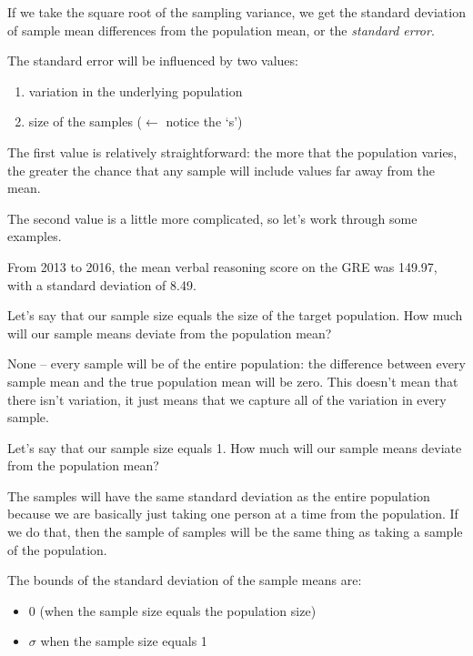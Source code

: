 \documentclass[11pt]{lecturenotes}
\begin{document}

If we take the square root of the sampling variance, we get the standard deviation of sample mean differences from the population mean, or the \emph{standard error}.


\slide
The standard error will be influenced by two values:
\begin{enumerate}
\item variation in the underlying population
\item size of the samples ($\leftarrow$ notice the `s')
\end{enumerate}

The first value is relatively straightforward: the more that the population varies, the greater the chance that any sample will include values far away from the mean. 

The second value is a little more complicated, so let's work through some examples. 

From 2013 to 2016, the mean verbal reasoning score on the GRE was 149.97, with a standard deviation of 8.49.

Let's say that our sample size equals the size of the target population. How much will our sample means deviate from the population mean? 

None -- every sample will be of the entire population: the difference between every sample mean and the true population mean will be zero. This doesn't mean that there isn't variation, it just means that we capture all of the variation in every sample. 

Let's say that our sample size equals 1. How much will our sample means deviate from the population mean? 

The samples will have the same standard deviation as the entire population because we are basically just taking one person at a time from the population. If we do that, then the sample of samples will be the same thing as taking a sample of the population. 

The bounds of the standard deviation of the sample means are: 
\begin{itemize}
\item 0 (when the sample size equals the population size)
\item $\sigma$ when the sample size equals 1
\end{itemize}
\end{document}
